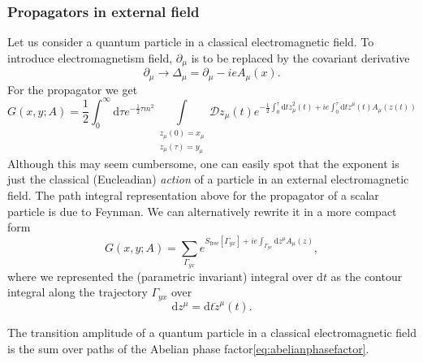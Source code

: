 \subsubsection{Propagators in external field}
Let us consider a quantum particle in a classical electromagnetic field. To
introduce electromagnetism field, $\partial_\mu$ is to be replaced by the
covariant derivative
\begin{equation}
  \partial_\mu \rightarrow \Delta_\mu = \partial_\mu - ieA_\mu(x).
\end{equation}
For the propagator we get
\begin{equation}
  G(x,y;A) = \frac{1}{2}\int_0^\infty\mathrm{d}\tau e^{-\frac{1}{2}\tau
      m^2}\int\limits_{\substack{z_\mu(0)=x_\mu\\ z_\mu(\tau)=y_\mu
        }}{\mathcal{D}z_\mu(t)e^{-\frac{1}{2}\int_0^\tau
        \mathrm{d}t\dot{z}^2_\mu(t)
    + ie\int_0^\tau\mathrm{d}t\dot{z}^\mu(t)A_\mu(z(t))}}
\end{equation}
Although this may seem cumbersome, one can easily spot that the exponent is
just the classical (Eucleadian) \textit{action} of a particle in an
external electromagnetic field. The path integral representation above for the
propagator of a scalar particle is due to Feynman. We can alternatively rewrite
it in a more compact form
\begin{equation}
  G(x,y;A)
  = \sum_{\Gamma_{yx}}{e^{S_{\mathrm{free}}[\Gamma_{yx}]+ie\int_{\Gamma_{yx}}\mathrm{d}z^\mu
  A_\mu(z)}},
\end{equation}
where we represented the (parametric invariant) integral over $\mathrm{d}t$ as
the contour integral along the trajectory $\Gamma_{yx}$ over
\begin{equation}
  \mathrm{d}z^\mu = \mathrm{d}t \dot{z}^\mu(t).
\end{equation}

The transition amplitude of a quantum particle in a classical electromagnetic
field is the sum over paths of the Abelian phase
factor\eqref{eq:abelianphasefactor}.

